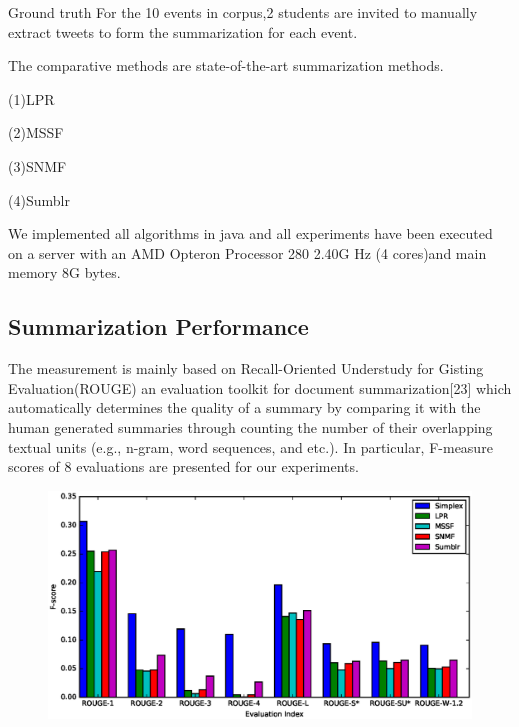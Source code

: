 \documentclass{llncs}
\begin{document}
Ground truth For the 10 events in corpus,2 students are invited to manually extract tweets to form the summarization for each event.

The comparative methods are  state-of-the-art summarization methods.

(1)LPR

(2)MSSF

(3)SNMF

(4)Sumblr


We implemented all algorithms in java and all experiments have been executed on a server with an AMD Opteron Processor 280 2.40G Hz (4 cores)and main memory 8G bytes.

\subsection{Summarization Performance}

The measurement is mainly based on Recall-Oriented Understudy for Gisting Evaluation(ROUGE) an evaluation toolkit for document summarization[23] which automatically determines the quality of a summary by comparing it with the human generated summaries through counting the number of their overlapping textual units (e.g., n-gram, word sequences, and etc.). In particular, F-measure scores of 8 evaluations are presented for our experiments.


\begin{figure}
    \centering
    \includegraphics[scale=0.6]{rouge.eps}

\end{figure}
\end{document}
